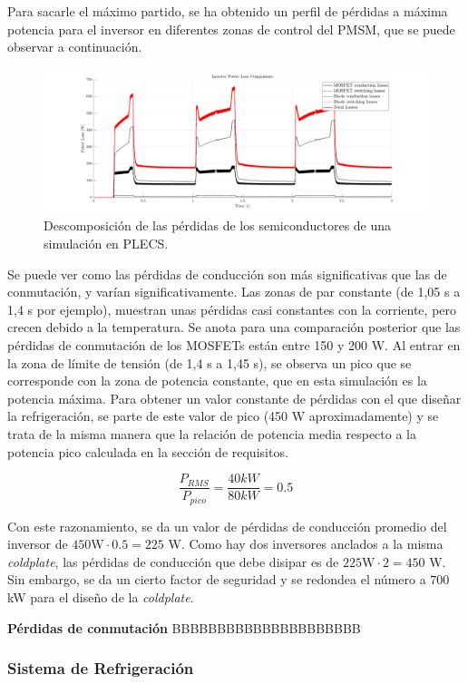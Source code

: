 Para sacarle el máximo partido, se ha obtenido un perfil de pérdidas a máxima potencia para el inversor en diferentes zonas de control del PMSM, que se puede observar a continuación.

\begin{figure}[H]
	\centering
	\includegraphics[width=0.9\linewidth]{fig/PLECS-invLosses}
	\caption{Descomposición de las pérdidas de los semiconductores de una simulación en PLECS.}
\end{figure}

Se puede ver como las pérdidas de conducción son más significativas que las de conmutación, y varían significativamente. Las zonas de par constante (de 1,05 s a 1,4 s por ejemplo), muestran unas pérdidas casi constantes con la corriente, pero crecen debido a la temperatura. Se anota para una comparación posterior que las pérdidas de conmutación de los MOSFETs están entre 150 y 200 W. Al entrar en la zona de límite de tensión (de 1,4 s a 1,45 s), se observa un pico que se corresponde con la zona de potencia constante, que en esta simulación es la potencia máxima. Para obtener un valor constante de pérdidas con el que diseñar la refrigeración, se parte de este valor de pico (450 W aproximadamente) y se trata de la misma manera que la relación de potencia media respecto a la potencia pico calculada en la sección de requisitos.

\[
\frac{P_{RMS}}{P_{pico}} = \frac{40 kW}{80 kW} = 0.5
\]

Con este razonamiento, se da un valor de pérdidas de conducción promedio del inversor de $450 \text{W} \cdot 0.5 = 225$ W. Como hay dos inversores anclados a la misma \textit{coldplate}, las pérdidas de conducción que debe disipar es de $225 \text{W} \cdot 2 = 450$ W. Sin embargo, se da un cierto factor de seguridad y se redondea el número a $700$ kW para el diseño de la \textit{coldplate}.


\textbf{Pérdidas de conmutación}
BBBBBBBBBBBBBBBBBBBBB


\subsubsection{Sistema de Refrigeración}

